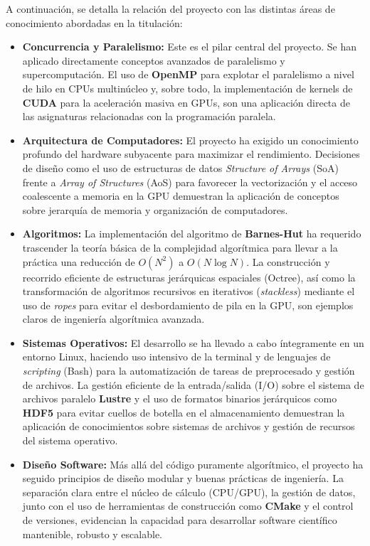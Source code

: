 A continuación, se detalla la relación del proyecto con las distintas áreas de conocimiento abordadas en la titulación:
\begin{itemize}
    \item \textbf{Concurrencia y Paralelismo:} Este es el pilar central del proyecto. Se han aplicado directamente conceptos avanzados de paralelismo y supercomputación. El uso de \textbf{OpenMP} para explotar el paralelismo a nivel de hilo en CPUs multinúcleo y, sobre todo, la implementación de kernels de \textbf{CUDA} para la aceleración masiva en GPUs, son una aplicación directa de las asignaturas relacionadas con la programación paralela.

    \item \textbf{Arquitectura de Computadores:} El proyecto ha exigido un conocimiento profundo del hardware subyacente para maximizar el rendimiento. Decisiones de diseño como el uso de estructuras de datos \textit{Structure of Arrays} (SoA) frente a \textit{Array of Structures} (AoS) para favorecer la vectorización y el acceso coalescente a memoria en la GPU demuestran la aplicación de conceptos sobre jerarquía de memoria y organización de computadores.

    \item \textbf{Algoritmos:} La implementación del algoritmo de \textbf{Barnes-Hut} ha requerido trascender la teoría básica de la complejidad algorítmica para llevar a la práctica una reducción de $O(N^2)$ a $O(N \log N)$. La construcción y recorrido eficiente de estructuras jerárquicas espaciales (Octree), así como la transformación de algoritmos recursivos en iterativos (\textit{stackless}) mediante el uso de \textit{ropes} para evitar el desbordamiento de pila en la GPU, son ejemplos claros de ingeniería algorítmica avanzada.

    \item \textbf{Sistemas Operativos:} El desarrollo se ha llevado a cabo íntegramente en un entorno Linux, haciendo uso intensivo de la terminal y de lenguajes de \textit{scripting} (Bash) para la automatización de tareas de preprocesado y gestión de archivos. La gestión eficiente de la entrada/salida (I/O) sobre el sistema de archivos paralelo \textbf{Lustre} y el uso de formatos binarios jerárquicos como \textbf{HDF5} para evitar cuellos de botella en el almacenamiento demuestran la aplicación de conocimientos sobre sistemas de archivos y gestión de recursos del sistema operativo.

    \item \textbf{Diseño Software:} Más allá del código puramente algorítmico, el proyecto ha seguido principios de diseño modular y buenas prácticas de ingeniería. La separación clara entre el núcleo de cálculo (CPU/GPU), la gestión de datos, junto con el uso de herramientas de construcción como \textbf{CMake} y el control de versiones, evidencian la capacidad para desarrollar software científico mantenible, robusto y escalable.
\end{itemize}

